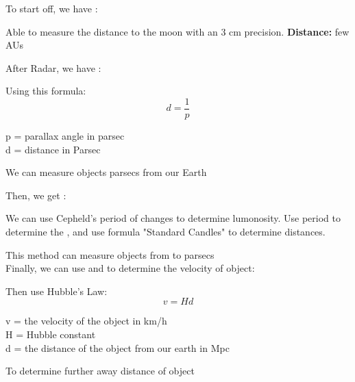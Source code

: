To start off, we have :
\begin{redblock}
    \begin{center}
        Able to measure the distance to the moon with an 3 cm precision. \textbf{Distance: } few AUs
    \end{center}
\end{redblock}

After Radar, we have \textbf{}:
\begin{redblock}
Using this formula:
    \[
        d = \frac{1}{p}
    \]
    \begin{center}
        p = parallax angle in parsec\\
        d = distance in Parsec\\
    \end{center}
We can measure objects  parsecs from our Earth
\end{redblock}

Then, we get \textbf{}:
\begin{redblock}
    We can use Cepheld's period of changes to determine lumonosity. Use period to determine the , and use formula "Standard Candles" to determine distances.
\end{redblock}

This method can measure objects from  to  parsecs\\

Finally, we can use  and  to determine the velocity of object:
\begin{redblock}
    Then use Hubble's Law:
    \[
        v = Hd
    \]
    \begin{center}
        v = the velocity of the object in km/h\\
        H = Hubble constant\\
        d = the distance of the object from our earth in Mpc\\
    \end{center}
    To determine further away distance of object
\end{redblock}


